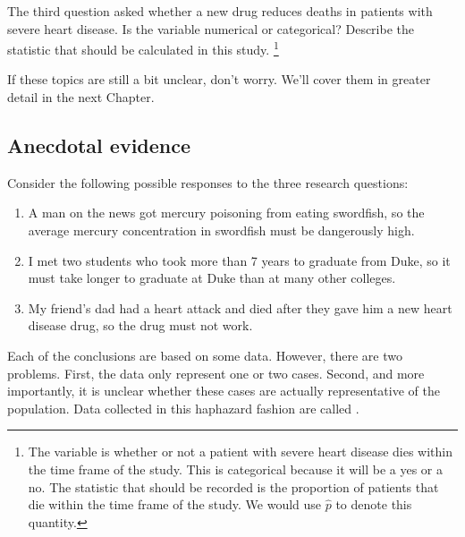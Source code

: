{\begin{exercise}The third question asked whether a new drug reduces deaths in patients with severe heart disease.  Is the variable numerical or categorical?  Describe the statistic that should be calculated in this study. \footnote{The variable is whether or not a patient with severe heart disease dies within the time frame of the study.  This is categorical because it will be a yes or a no.  The statistic that should be recorded is the proportion of patients that die within the time frame of the study.  We would use $\hat{p}$ to denote this quantity. }
\end{exercise}

If these topics are still a bit unclear, don't worry. We'll cover them in greater detail in the next Chapter.
}

\subsection{Anecdotal evidence}
\label{anecdotalEvidenceSubsection}

Consider the following possible responses to the three research questions:
\begin{enumerate}
\item A man on the news got mercury poisoning from eating swordfish, so the average mercury concentration in swordfish must be dangerously high.
\item\label{iKnowThreeStudentsWhoTookMoreThan7YearsToGraduateAtDuke} I met two students who took more than 7 years to graduate from Duke, so it must take longer to graduate at Duke than at many other colleges.
\item\label{myFriendsDadDiedAfterSulphinpyrazon} My friend's dad had a heart attack and died after they gave him a new heart disease drug, so the drug must not work.
\end{enumerate}
Each of the conclusions are based on some data. However, there are two problems. First, the data only represent one or two cases. Second, and more importantly, it is unclear whether these cases are actually representative of the population. Data collected in this haphazard fashion are called .

